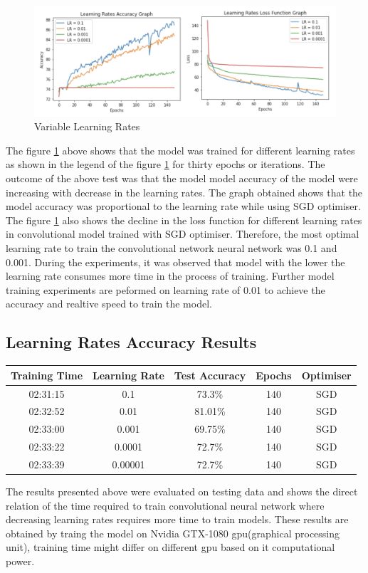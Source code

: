 \begin{figure}[!htp]
    \centering
    \includegraphics[width=15cm]{Images/lr.png}
    \caption{Variable Learning Rates}
    \label{fig:lrates}
\end{figure}

The figure \ref{fig:lrates} above shows that the model was trained for different learning rates as shown
in the legend of the figure \ref{fig:lrates} for thirty epochs or iterations. The outcome of the above test 
was that the model model accuracy of the model were increasing with decrease in the learning rates. 
The graph obtained shows that the model accuracy was proportional to the learning rate while using SGD optimiser. 
The figure \ref{fig:lrates} also shows the decline in the loss function for different learning rates in 
convolutional model trained with SGD optimiser. Therefore, the most optimal learning rate to train the convolutional network 
neural network was 0.1 and 0.001. During the experiments, it was observed that model with the lower the learning rate consumes more time in the 
process of training. Further model training experiments are peformed on 
learning rate of 0.01 to achieve the accuracy and realtive speed to train the model.
\pagebreak

\subsection{Learning Rates Accuracy Results}

\begin{center}
    \begin{tabular} { | c | c | c | c | c |}
        \hline
        Training Time & Learning Rate & Test Accuracy & Epochs  & Optimiser\\ 
        \hline
        02:31:15 & 0.1 & 73.3\% & 140 & SGD \\ 
        \hline 
        02:32:52 & 0.01 & 81.01\% & 140 & SGD  \\
        \hline 
        02:33:00 & 0.001 & 69.75\% & 140 & SGD \\
        \hline
        02:33:22 & 0.0001 & 72.7\% & 140 & SGD \\
        \hline
        02:33:39 & 0.00001 & 72.7\% & 140 & SGD \\
        \hline
    \end{tabular}
\end{center}

The results presented above were evaluated on testing data and shows the 
direct relation of the time required to train convolutional neural network 
where decreasing learning rates requires more time to train models. These results 
are obtained by traing the model on Nvidia GTX-1080 gpu(graphical processing unit), training 
time might differ on different gpu based on it computational power.